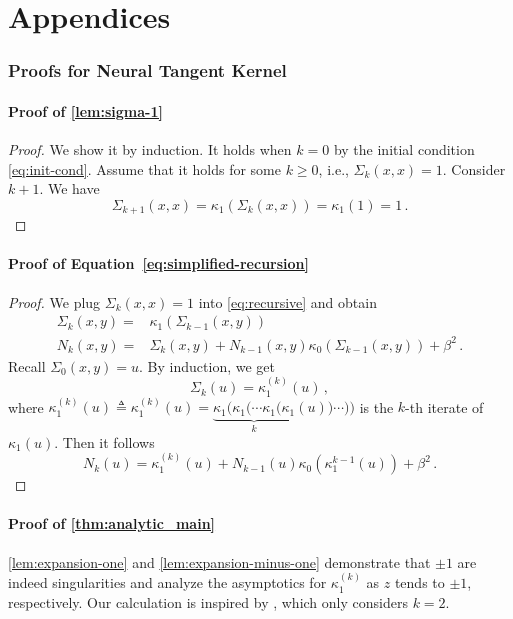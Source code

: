 \documentclass[11pt]{article}
\newcommand{\g}{\kappa_1}
\begin{document}
\newpage
\ifarxiv

\else

\fi


\newpage
\appendix
\part{Appendices}\label{Appendix}
\parttoc
\section{Proofs for Neural Tangent Kernel}\label{sec:NTK}

\subsection{Proof of \cref{lem:sigma-1}}\label{sec:proof-sigma-1}
\begin{proof}
We show it by induction. It holds when $k=0$ by the initial condition \eqref{eq:init-cond}. Assume that it holds for some $k\ge 0$, i.e., $\Sigma_k(x,x)=1$. Consider $k+1$. We have \[
\Sigma_{k+1}(x,x) = \kappa_1(\Sigma_{k}(x,x)) = \kappa_1(1) = 1\,.
\]
\end{proof}

\subsection{Proof of Equation~\eqref{eq:simplified-recursion}}\label{sec:proof-eq4}
\begin{proof}
We plug $\Sigma_k(x,x)=1$ into \eqref{eq:recursive} and obtain \begin{align*}
    \Sigma_k(x,y) ={}& \kappa_1(\Sigma_{k-1}(x,y)) \\
    N_k(x,y) ={}& \Sigma_k(x,y) + N_{k-1}(x,y)\kappa_0(\Sigma_{k-1}(x,y)) + \beta^2\,.
\end{align*}
Recall $\Sigma_0(x,y) = u$. By induction, we get \[
\Sigma_k(u) = \kappa_1^{(k)}(u)\,,
\]
where $\g^{(k)}(u)\triangleq \g^{(k)}(u) = \underbrace{\g( \g ( \cdots \g( \g}_{k}(u))\cdots ))$ is the $k$-th iterate of $\g(u)$. Then it follows \[
N_k(u) = \g^{(k)}(u) + N_{k-1}(u)\kappa_0(\g^{k-1}(u)) + \beta^2\,.
\]
\end{proof}

\subsection{Proof of \cref{thm:analytic_main}}\label{sec:NTK1}

\cref{lem:expansion-one} and \cref{lem:expansion-minus-one} demonstrate that $\pm 1$ are indeed singularities and analyze the asymptotics for $\kappa_1^{(k)}$ as $z$ tends to $\pm 1$, respectively. Our calculation is inspired by \citet{pinelis}, which only considers $k=2$.
\end{document}
